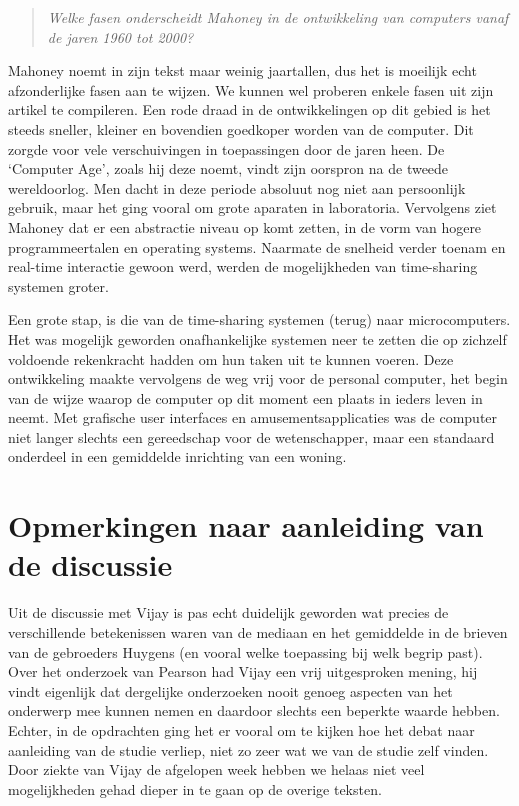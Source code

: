 \documentclass[a4paper,11pt]{article}
\begin{document}
\begin{quote}
\emph{Welke fasen onderscheidt Mahoney in de ontwikkeling van computers vanaf
  de jaren 1960 tot 2000?}
\end{quote}


Mahoney noemt in zijn tekst maar weinig jaartallen, dus het is moeilijk echt
afzonderlijke fasen aan te wijzen. We kunnen wel proberen enkele fasen uit
zijn artikel te compileren. Een rode draad in de ontwikkelingen op dit gebied
is het steeds sneller, kleiner en bovendien goedkoper worden van de
computer. Dit zorgde voor vele verschuivingen in toepassingen door de jaren
heen. De `Computer Age', zoals hij deze noemt, vindt zijn oorspron na de
tweede wereldoorlog. Men dacht in deze periode absoluut nog niet aan
persoonlijk gebruik, maar het ging vooral om grote aparaten in
laboratoria. Vervolgens ziet Mahoney dat er een abstractie niveau op komt
zetten, in de vorm van hogere programmeertalen en operating systems. Naarmate
de snelheid verder toenam en real-time interactie gewoon werd, werden de
mogelijkheden van time-sharing systemen groter.

Een grote stap, is die van de time-sharing systemen (terug) naar
microcomputers. Het was mogelijk geworden onafhankelijke systemen neer te
zetten die op zichzelf voldoende rekenkracht hadden om hun taken uit te kunnen
voeren. Deze ontwikkeling maakte vervolgens de weg vrij voor de personal
computer, het begin van de wijze waarop de computer op dit moment een plaats
in ieders leven in neemt. Met grafische user interfaces en
amusementsapplicaties was de computer niet langer slechts een gereedschap voor
de wetenschapper, maar een standaard onderdeel in een gemiddelde inrichting
van een woning.


\section*{Opmerkingen naar aanleiding van de discussie}


Uit de discussie met Vijay is pas echt duidelijk geworden wat precies de
verschillende betekenissen waren van de mediaan en het gemiddelde in de
brieven van de gebroeders Huygens (en vooral welke toepassing bij welk begrip
past). Over het onderzoek van Pearson had Vijay een vrij uitgesproken mening,
hij vindt eigenlijk dat dergelijke onderzoeken nooit genoeg aspecten van het
onderwerp mee kunnen nemen en daardoor slechts een beperkte waarde
hebben. Echter, in de opdrachten ging het er vooral om te kijken hoe het debat
naar aanleiding van de studie verliep, niet zo zeer wat we van de studie zelf
vinden. Door ziekte van Vijay de afgelopen week hebben we helaas niet veel
mogelijkheden gehad dieper in te gaan op de overige teksten.
\end{document}

